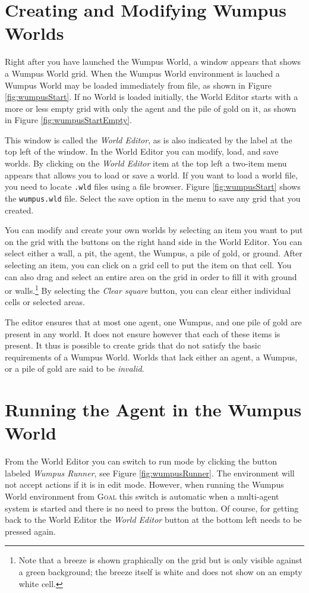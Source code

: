 \documentclass{article}
\newcommand{\GOAL}{\textsc{Goal} }
\begin{document}
%
%
%
\section{Creating and Modifying Wumpus Worlds}
%
Right after you have launched the Wumpus World, a window appears that shows a
Wumpus World grid. When the Wumpus World environment is lauched a
Wumpus World may be loaded immediately from file, as shown in Figure
\ref{fig:wumpusStart}. If no World is loaded initially, the World Editor starts with a more or less
empty grid with only the agent and the pile of gold on it, as shown in Figure
\ref{fig:wumpusStartEmpty}.

This window is called the \textit{World Editor}, as is also indicated by the
label at the top left of the window. In the World Editor you can modify, load,
and save worlds. By clicking on the \textit{World Editor} item at the top left a
two-item menu appears that allows you to load or save a world. If you want to load
a world file, you need to locate \verb|.wld| files using a file browser.
Figure \ref{fig:wumpusStart} shows the \verb|wumpus.wld| file. Select the save
option in the menu to save any grid that you created.

You can modify and create your own worlds by selecting an item you want to
put on the grid with the buttons on the right hand side in the World Editor. You
can select either a wall, a pit, the agent, the Wumpus, a pile of gold,
or ground. After selecting an item, you can click on a grid cell to put the
item on that cell. You can also drag and select an entire area on the
grid in order to fill it with ground or walls.\footnote{Note that a breeze is shown
graphically on the grid but is only visible against a green background; the
breeze itself is white and does not show on an empty white cell.} By selecting
the \textit{Clear square} button, you can clear either individual cells or selected areas.


The editor ensures that at most one agent, one Wumpus, and one pile
of gold are present in any world. It does not ensure however that each of these
items is present. It thus is possible to create grids that do not satisfy the
basic requirements of a Wumpus World. Worlds that lack either an agent, a
Wumpus, or a pile of gold are said to be \textit{invalid}.


%
%
%
\section{Running the Agent in the Wumpus World}
%
From the World Editor you can switch to run mode by clicking the button
labeled \textit{Wumpus Runner}, see Figure \ref{fig:wumpusRunner}. The
environment will not accept actions if it is in edit mode. However, when running
the Wumpus World environment from \GOAL this switch is automatic when a
multi-agent system is started and there is no need to press the button. Of
course, for getting back to the World Editor the \textit{World Editor} button at
the bottom left needs to be pressed again.
\end{document}
